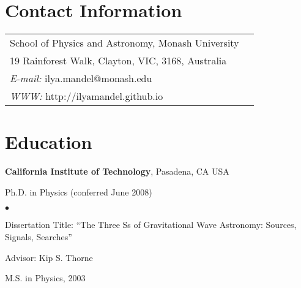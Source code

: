 \documentclass[margin,line]{res}
\newenvironment{list1}{
  \begin{list}{\ding{113}}{%
      \setlength{\itemsep}{0in}
      \setlength{\parsep}{0in} \setlength{\parskip}{0in}
      \setlength{\topsep}{0in} \setlength{\partopsep}{0in} 
      \setlength{\leftmargin}{0.17in}}}{\end{list}}
\newenvironment{list2}{
  \begin{list}{$\bullet$}{%
      \setlength{\itemsep}{0in}
      \setlength{\parsep}{0in} \setlength{\parskip}{0in}
      \setlength{\topsep}{0in} \setlength{\partopsep}{0in} 
      \setlength{\leftmargin}{0.2in}}}{\end{list}}
\begin{document}

\begin{resume}
\section{\sc Contact Information}
\vspace{.05in}
\begin{tabular}{@{}p{4in}p{2in}}
School of Physics and Astronomy, Monash University \\
19 Rainforest Walk, Clayton,  VIC, 3168, Australia \\
{\it E-mail:}  ilya.mandel@monash.edu \\
{\it WWW:} http://ilyamandel.github.io \\         
\end{tabular}



\section{\sc Education}
{\bf California Institute of Technology}, Pasadena, CA USA\\
\vspace*{-.1in}
\begin{list1}
\item[] Ph.D. in Physics (conferred June 2008)
\begin{list2}
\vspace*{.05in}
\item Dissertation Title:  ``The Three Ss of Gravitational Wave Astronomy: 
Sources, Signals, Searches'' 
\item Advisor:  Kip S. Thorne
\end{list2}
\vspace*{.05in}
\item[] M.S. in Physics, 2003 
\end{list1}


\end{resume}
\end{document}
